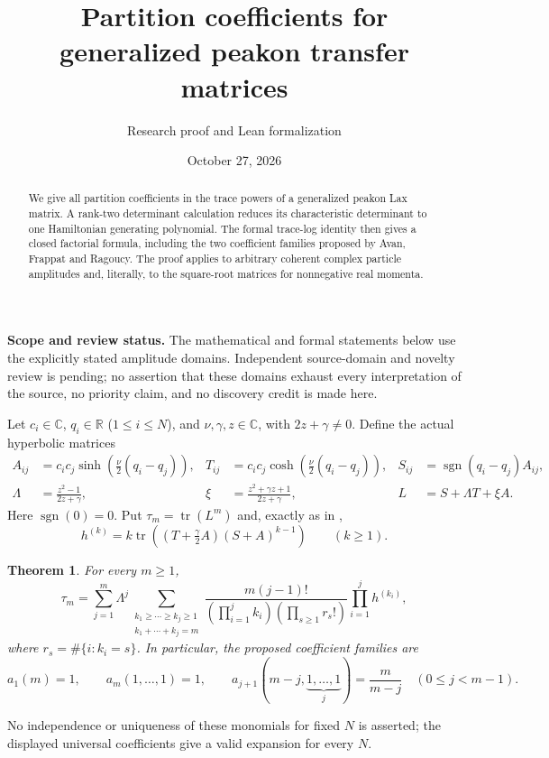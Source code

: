 \documentclass[11pt]{article}
\title{Partition coefficients for generalized peakon transfer matrices}
\author{Research proof and Lean formalization}
\date{October 27, 2026}
\newtheorem{theorem}{Theorem}
\begin{document}
\maketitle
\begin{abstract}
We give all partition coefficients in the trace powers of a generalized peakon Lax matrix. A rank-two determinant calculation reduces its characteristic determinant to one Hamiltonian generating polynomial. The formal trace-log identity then gives a closed factorial formula, including the two coefficient families proposed by Avan, Frappat and Ragoucy. The proof applies to arbitrary coherent complex particle amplitudes and, literally, to the square-root matrices for nonnegative real momenta.
\end{abstract}
\noindent\textbf{Scope and review status.} The mathematical and formal statements below use the explicitly stated amplitude domains. Independent source-domain and novelty review is pending; no assertion that these domains exhaust every interpretation of the source, no priority claim, and no discovery credit is made here.

Let $c_i\in\mathbb C$, $q_i\in\mathbb R$ ($1\leq i\leq N$), and $\nu,\gamma,z\in\mathbb C$, with $2z+\gamma\ne0$. Define the actual hyperbolic matrices
\begin{align*}
 A_{ij}&=c_ic_j\sinh\!\left(\frac\nu2(q_i-q_j)\right),&
 T_{ij}&=c_ic_j\cosh\!\left(\frac\nu2(q_i-q_j)\right),&
 S_{ij}&=\operatorname{sgn}(q_i-q_j)A_{ij},\\
 \Lambda&=\frac{z^2-1}{2z+\gamma},&
 \xi&=\frac{z^2+\gamma z+1}{2z+\gamma},&
 L&=S+\Lambda T+\xi A.
\end{align*}
Here $\operatorname{sgn}(0)=0$. Put $\tau_m=\operatorname{tr}(L^m)$ and, exactly as in \cite[eq.~(5.17)]{AFR},
\begin{equation}\label{h}
 h^{(k)}=k\operatorname{tr}\left((T+\tfrac\gamma2 A)(S+A)^{k-1}\right)\qquad(k\geq1).
\end{equation}

\begin{theorem}\label{main}
For every $m\geq1$,
\begin{equation}\label{expansion}
 \tau_m=\sum_{j=1}^m\Lambda^j
 \sum_{\substack{k_1\geq\cdots\geq k_j\geq1\\k_1+\cdots+k_j=m}}
 \frac{m(j-1)!}{(\prod_{i=1}^j k_i)(\prod_{s\geq1}r_s!)}
 \prod_{i=1}^j h^{(k_i)},
\end{equation}
where $r_s=\#\{i:k_i=s\}$. In particular, the proposed coefficient families are
\begin{equation}\label{special}
 a_1(m)=1,\qquad a_m(1,\ldots,1)=1,\qquad
 a_{j+1}(m-j,\underbrace{1,\ldots,1}_{j})=\frac m{m-j}\quad(0\leq j<m-1).
\end{equation}
\end{theorem}
No independence or uniqueness of these monomials for fixed $N$ is asserted; the displayed universal coefficients give a valid expansion for every $N$.
\end{document}

